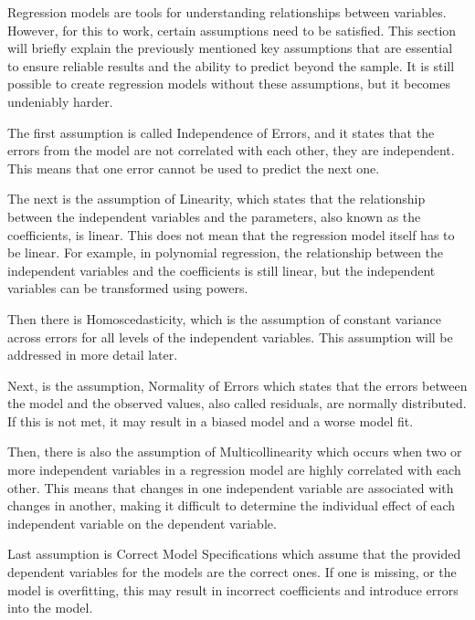 \noindent Regression models are tools for understanding relationships between variables. However, for this to work, certain assumptions need to be satisfied. This section will briefly explain the previously mentioned key assumptions that are essential to ensure reliable results and the ability to predict beyond the sample. It is still possible to create regression models without these assumptions, but it becomes undeniably harder.  \newline

\noindent The first assumption is called Independence of Errors, and it states that the errors from the model are not correlated with each other, they are independent. This means that one error cannot be used to predict the next one. \newline


\noindent The next is the assumption of Linearity, which states that the relationship between the independent variables and the parameters, also known as the coefficients, is linear. This does not mean that the regression model itself has to be linear. For example, in polynomial regression, the relationship between the independent variables and the coefficients is still linear, but the independent variables can be transformed using powers.\newline


\noindent Then there is Homoscedasticity, which is the assumption of constant variance across errors for all levels of the independent variables. This assumption will be addressed in more detail later. \newline

\noindent Next, is the assumption, Normality of Errors which states that the errors between the model and the observed values, also called residuals, are normally distributed. If this is not met, it may result in a biased model and a worse model fit. \newline


\noindent Then, there is also the assumption of Multicollinearity which occurs when two or more independent variables in a regression model are highly correlated with each other. This means that changes in one independent variable are associated with changes in another, making it difficult to determine the individual effect of each independent variable on the dependent variable. \newline

\noindent Last assumption is Correct Model Specifications which assume that the provided dependent variables for the models are the correct ones. If one is missing, or the model is overfitting, this may result in incorrect coefficients and introduce errors into the model. \newline

